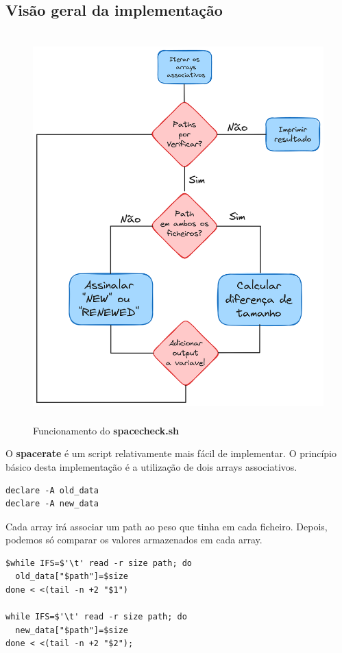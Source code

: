 \subsection{Visão geral da implementação}
\begin{figure}[H]
    \centering
    \includegraphics[height=15cm]{Fluxograma_Spacerate.png}
    \caption{Funcionamento do \textbf{spacecheck.sh}}
\end{figure}
O \textbf{spacerate} é um script relativamente mais fácil de
implementar. O princípio básico desta implementação é 
a utilização de dois arrays associativos. 
\begin{verbatim}
declare -A old_data
declare -A new_data
\end{verbatim}
Cada array irá associar um path ao peso que tinha em cada ficheiro.
Depois, podemos só comparar os valores armazenados em cada
array.
\begin{verbatim}
$while IFS=$'\t' read -r size path; do
  old_data["$path"]=$size
done < <(tail -n +2 "$1") 

while IFS=$'\t' read -r size path; do
  new_data["$path"]=$size
done < <(tail -n +2 "$2");
\end{verbatim}
